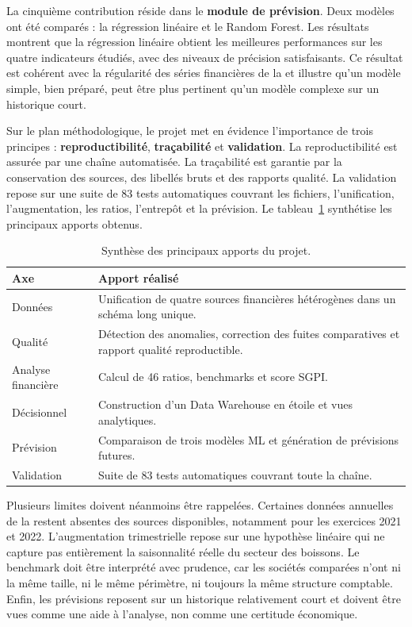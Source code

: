 \medskip
La cinquième contribution réside dans le \textbf{module de prévision}. Deux
modèles ont été comparés : la régression linéaire et le Random Forest. Les
résultats montrent que la régression linéaire obtient les meilleures performances
sur les quatre indicateurs étudiés, avec des niveaux de précision satisfaisants.
Ce résultat est cohérent avec la régularité des séries financières de la \sfbt et
illustre qu'un modèle simple, bien préparé, peut être plus pertinent qu'un modèle
complexe sur un historique court.

\medskip
Sur le plan méthodologique, le projet met en évidence l'importance de trois
principes : \textbf{reproductibilité}, \textbf{traçabilité} et \textbf{validation}.
La reproductibilité est assurée par une chaîne automatisée. La traçabilité est
garantie par la conservation des sources, des libellés bruts et des rapports
qualité. La validation repose sur une suite de 83 tests automatiques couvrant les
fichiers, l'unification, l'augmentation, les ratios, l'entrepôt et la prévision.
Le tableau~\ref{tab:apports_projet} synthétise les principaux apports obtenus.

\begin{table}[H]
\centering
\caption[Apports du projet]{Synthèse des principaux apports du projet.}
\label{tab:apports_projet}
\begin{tabularx}{\linewidth}{|p{3.2cm}|X|}
\hline
\textbf{Axe} & \textbf{Apport réalisé} \\ \hline
Données & Unification de quatre sources financières hétérogènes dans un schéma long unique. \\ \hline
Qualité & Détection des anomalies, correction des fuites comparatives et rapport qualité reproductible. \\ \hline
Analyse financière & Calcul de 46 ratios, benchmarks et score SGPI. \\ \hline
Décisionnel & Construction d'un Data Warehouse en étoile et vues analytiques. \\ \hline
Prévision & Comparaison de trois modèles ML et génération de prévisions futures. \\ \hline
Validation & Suite de 83 tests automatiques couvrant toute la chaîne. \\ \hline
\end{tabularx}
\end{table}

\medskip
Plusieurs limites doivent néanmoins être rappelées. Certaines données annuelles
de la \sfbt restent absentes des sources disponibles, notamment pour les exercices
2021 et 2022. L'augmentation trimestrielle repose sur une hypothèse linéaire qui
ne capture pas entièrement la saisonnalité réelle du secteur des boissons. Le
benchmark doit être interprété avec prudence, car les sociétés comparées n'ont ni
la même taille, ni le même périmètre, ni toujours la même structure comptable.
Enfin, les prévisions reposent sur un historique relativement court et doivent
être vues comme une aide à l'analyse, non comme une certitude économique.

